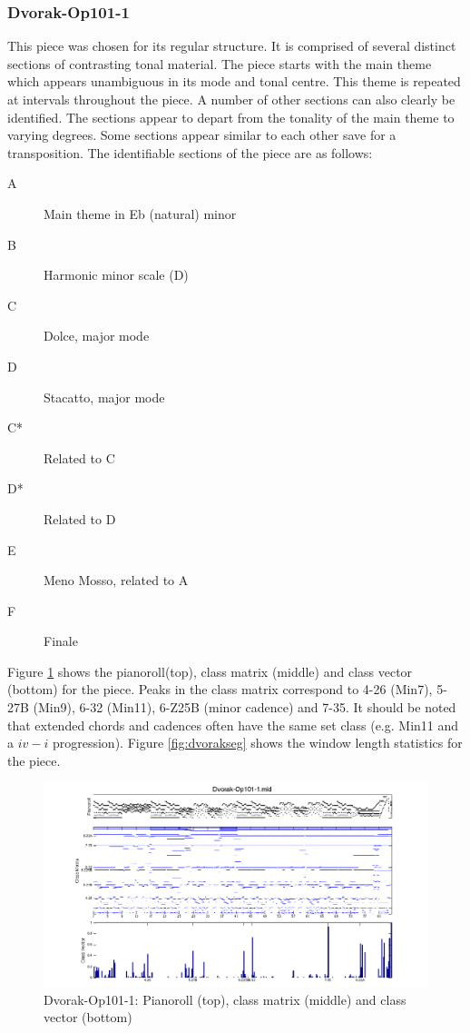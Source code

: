\documentclass{article}
\begin{document}
\subsubsection{Dvorak-Op101-1}
\label{sec-8-1-2}

This piece was chosen for its regular structure. It is comprised of
several distinct sections of contrasting tonal material. The piece
starts with the main theme which appears unambiguous in its mode and
tonal centre. This theme is repeated at intervals throughout the
piece. A number of other sections can also clearly be identified. The
sections appear to depart from the tonality of the main theme to
varying degrees. Some sections appear similar to each other save for a
transposition. The identifiable sections of the piece are as follows:
\begin{description}
\item[A] Main theme in Eb (natural) minor
\item[B] Harmonic minor scale (D)
\item[C] Dolce, major mode
\item[D] Stacatto, major mode
\item[C*] Related to C
\item[D*] Related to D
\item[E] Meno Mosso, related to A
\item[F] Finale
\end{description}
Figure \ref{fig:dvorak} shows the pianoroll(top), class matrix
(middle) and class vector (bottom) for the piece. Peaks in the class
matrix correspond to 4-26 (Min7), 5-27B (Min9), 6-32 (Min11), 6-Z25B
(minor cadence) and 7-35. It should be noted that extended chords and
cadences often have the same set class (e.g. Min11 and a $iv-i$
progression). Figure \ref{fig:dvorakseg} shows the window length
statistics for the piece.
\begin{figure}[htb]
\centering
\includegraphics[width=.8\linewidth]{./plots/dvorak.png}
\caption{\label{fig:dvorak}Dvorak-Op101-1: Pianoroll (top), class matrix (middle) and class vector (bottom)}
\end{figure}
\end{document}
